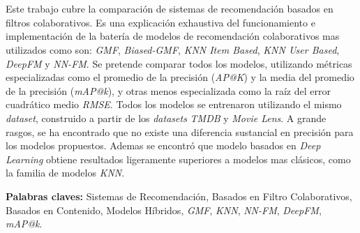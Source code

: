 \chapter*{\runtitulo}

\noindent Este trabajo cubre la comparación de sistemas de recomendación basados en filtros colaborativos. Es una explicación exhaustiva del funcionamiento e implementación de la batería de modelos de recomendación colaborativos mas utilizados como son: \textit{GMF}, \textit{Biased-GMF}, \textit{KNN Item Based}, \textit{KNN User Based}, \textit{DeepFM} y \textit{NN-FM}. Se pretende comparar todos los modelos, utilizando métricas especializadas como el promedio de la precisión (\textit{AP@K}) y la media del promedio de la precisión (\textit{mAP@k}), y otras menos especializada como la raíz del error cuadrático medio \textit{RMSE}. Todos los modelos se entrenaron utilizando el mismo \textit{dataset}, construido a partir de los \textit{datasets} \textit{TMDB} y \textit{Movie Lens}. A grande rasgos, se ha encontrado que no existe una diferencia sustancial en precisión para los modelos propuestos. Ademas se encontró que modelo basados en \textit{Deep Learning} obtiene resultados ligeramente superiores a modelos mas clásicos, como la familia de modelos \textit{KNN}. 

\bigskip

\noindent\textbf{Palabras claves:} Sistemas de Recomendación, Basados en Filtro Colaborativos, Basados en Contenido, Modelos Híbridos, \textit{GMF}, \textit{KNN}, \textit{NN-FM}, \textit{DeepFM}, \textit{mAP@k}.

